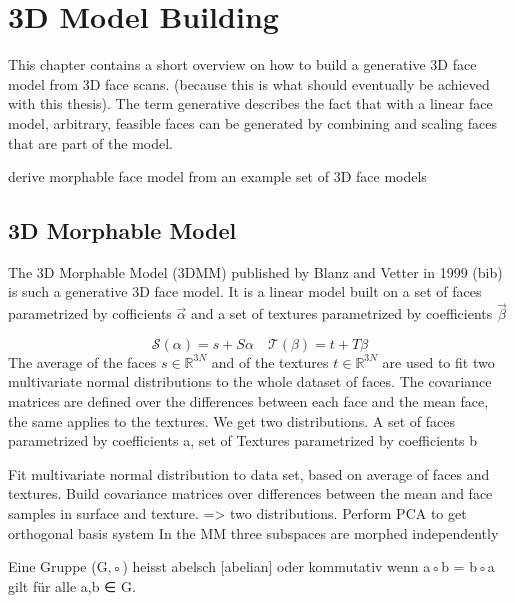 \chapter{3D Model Building}
This chapter contains a short overview on how to build a generative 3D face model from 3D face scans. (because this is what should eventually be achieved with this thesis). The term generative describes the fact that with a linear face model, arbitrary, feasible faces can be generated by combining and scaling faces that are part of the model.

derive morphable face model from an example set of 3D face models
\section{3D Morphable Model}
The 3D Morphable Model (3DMM) published by Blanz and Vetter in 1999 (bib) is such a generative 3D face model. It is a linear model built on a set of faces parametrized by cofficients $\vec \alpha$ and a set of textures parametrized by coefficients $\vec \beta$
\begin{comment}
It combines a linear model of faces $S(\alpha)$ with a linear model $T(\beta)$ of the corresponding textures.    
\end{comment}

\begin{equation}
    \mathcal{S}(\alpha)=s+S\alpha \quad \mathcal{T}(\beta)=t+T\beta 
\end{equation}
The average of the faces $s \in \mathbb{R}^{3N}$ and of the textures $t \in \mathbb{R}^{3N}$ are used to fit two multivariate normal distributions to the whole dataset of faces. The covariance matrices are defined over the differences between each face and the mean face, the same applies to the textures.
We get two distributions.
A set of faces parametrized by coefficients a, set of Textures parametrized by coefficients b

\begin{equation}

\end{equation}
Fit multivariate normal distribution to data set, based on average of faces and textures. Build covariance matrices over differences between the mean and face samples in surface and texture. => two distributions. Perform PCA to get orthogonal basis system
In the MM three subspaces are morphed independently

Eine Gruppe (G,◦) heisst abelsch [abelian] oder kommutativ wenn a◦b = b◦a gilt für
alle a,b ∈ G.

